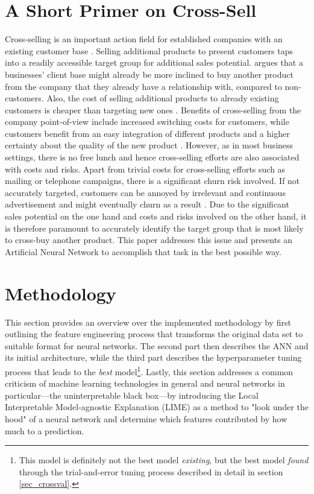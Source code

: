 \documentclass[12pt,a4paper]{article}
\begin{document}
\section{A Short Primer on Cross-Sell}
Cross-selling is an important action field for established companies with an existing customer base \citep{liCrossSellingRightProduct2011}.
Selling additional products to present customers taps into a readily accessible target group for additional sales potential.
\cite{felveyCrosssellingComputer1982} argues that a businesses' client base might already be more inclined to buy another product from the company that they already have a relationship with, compared to non-customers.
Also, the cost of selling additional products to already existing customers is cheaper than targeting new ones \citep{reichheldZeroDefectionsQuality1990}.
Benefits of cross-selling from the company point-of-view include increased switching costs for customers, while customers benefit from an easy integration
of different products and a higher certainty about the quality of the new product \citep{kamakuraApplyingLatentTrait1991, kamakuraCrosssellingDatabaseMarketing2003}. 
However, as in most business settings, there is no free lunch and hence cross-selling efforts are also associated with costs and risks.
Apart from trivial costs for cross-selling efforts such as mailing or telephone campaigns, there is a significant churn risk involved.
If not accurately targeted, customers can be annoyed by irrelevant and continuous advertisement and might eventually churn as a result \citep{keaveneyCustomerSwitchingBehavior1995}.
Due to the significant sales potential on the one hand and costs and risks involved on the other hand, it is therefore paramount to accurately identify the target group that is most likely to cross-buy another product.
This paper addresses this issue and presents an Artificial Neural Network to accomplish that task in the best possible way.


\section{Methodology}
This section provides an overview over the implemented methodology by first outlining the feature engineering process that transforms the original data set
to suitable format for neural networks.
The second part then describes the ANN and its initial architecture, while the third part describes the hyperparameter tuning process
that leads to the \textit{best} model\footnote{This model is definitely not the best model \textit{existing}, but the best model \textit{found} through the trial-and-error tuning process described in detail in section \ref{sec_crossval}.}.
Lastly, this section addresses a common criticism of machine learning technologies in general and neural networks in particular---the 
uninterpretable black box---by introducing the Local Interpretable Model-agnostic Explanation (LIME) as a method to 
"look under the hood" of a neural network and determine which features contributed by how much to a prediction.
\end{document}
